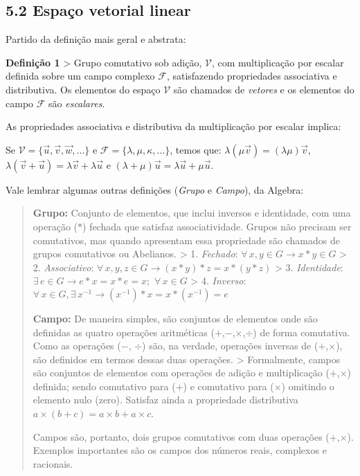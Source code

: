 \documentclass[11pt]{article}
\begin{document}
    \hypertarget{espauxe7o-vetorial-linear}{%
\subsection{5.2 Espaço vetorial
linear}\label{espauxe7o-vetorial-linear}}

Partido da definição mais geral e abstrata:

\textbf{Definição 1} \textgreater{} Grupo comutativo sob adição,
\(\mathcal{V}\), com multiplicação por escalar definida sobre um campo
complexo \(\mathcal{F}\), satisfazendo propriedades associativa e
distributiva. Os elementos do espaço \(\mathcal{V}\) são chamados de
\emph{vetores} e os elementos do campo \(\mathcal{F}\) são
\emph{escalares}.

As propriedades associativa e distributiva da multiplicação por escalar
implica:

Se \(\mathcal{V}=\{\vec{u},\vec{v},\vec{w},...\}\) e
\(\mathcal{F}=\{\lambda,\mu,\kappa,...\}\), temos que:
\(\lambda(\mu\vec{v})=(\lambda\mu)\vec{v}\),\\
\(\lambda(\vec{v}+\vec{u})=\lambda\vec{v}+\lambda\vec{u}\) e
\((\lambda+\mu)\vec{u}=\lambda\vec{u}+\mu\vec{u}\).

Vale lembrar algumas outras definições (\emph{Grupo} e \emph{Campo}), da
Algebra:

\begin{quote}
\textbf{Grupo:} Conjunto de elementos, que inclui inversos e identidade,
com uma operação (\(*\)) fechada que satisfaz associatividade. Grupos
não precisam ser comutativos, mas quando apresentam essa propriedade são
chamados de grupos comutativos ou Abelianos. \textgreater{} 1.
\emph{Fechado}: \(\forall\, x,y \in G \rightarrow x*y \in G\)
\textgreater{} 2. \emph{Associativo}:
\(\forall\, x,y,z \in G \rightarrow (x*y)*z=x*(y*z)\) \textgreater{} 3.
\emph{Identidade}:
\(\exists\, e\in G \rightarrow e*x=x*e=x; \,\, \forall\, x \in G\)
\textgreater{} 4. \emph{Inverso}:
\(\forall\, x \in G, \exists\, x^{-1} \rightarrow (x^{-1})*x=x*(x^{-1})=e\)

\textbf{Campo:} De maneira simples, são conjuntos de elementos onde são
definidas as quatro operações aritméticas
(\(+\),\(-\),\(\times\),\(\div\)) de forma comutativa. Como as operações
(\(-\), \(\div\)) são, na verdade, operações inversas de
(\(+\),\(\times\)), são definidos em termos dessas duas operações.
\textgreater{} Formalmente, campos são conjuntos de elementos com
operações de adição e multiplicação (\(+\),\(\times\)) definida; sendo
comutativo para (\(+\)) e comutativo para (\(\times\)) omitindo o
elemento nulo (zero). Satisfaz ainda a propriedade distributiva
\(a\times(b+c)=a\times b + a\times c\).

Campos são, portanto, dois grupos comutativos com duas operações
(\(+\),\(\times\)). Exemplos importantes são os campos dos números
reais, complexos e racionais.
\end{quote}
\end{document}
